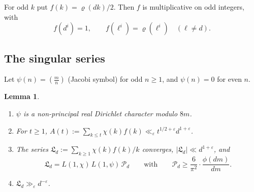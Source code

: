 \documentclass[11pt]{amsart}
\newtheorem{lemma}[theorem]{Lemma}
\theoremstyle{remark}
\theoremstyle{definition}
\numberwithin{equation}{section}
\newcommand{\eps}{\varepsilon}
\newcommand{\Lf}{\mathfrak{L}}
\newcommand{\leg}[2]{\left(\frac{#1}{#2}\right)}
\begin{document}
For odd $k$ put $f(k)=\varrho(dk)/2$. Then $f$ is multiplicative on odd integers, with
\begin{equation}\label{eq:f}
f(d^i)=1,\qquad f(\ell^i)=\varrho(\ell^i)\quad(\ell\ne d).
\end{equation}

\subsection{The singular series}
Let $\psi(n)=\leg mn$ (Jacobi symbol) for odd $n\ge1$, and $\psi(n)=0$ for even $n$.

\begin{lemma}\label{lem:L}
\begin{enumerate}
\item[(a)] $\psi$ is a non-principal real Dirichlet character modulo $8m$.
\item[(b)] For $t\ge1$, $A(t):=\sum_{k\le t}\chi(k)f(k)\ll_\eps t^{1/2+\eps}d^{1+\eps}$.
\item[(c)] The series $\Lf_d:=\sum_{k\ge1}\chi(k)f(k)/k$ converges, $|\Lf_d|\ll d^{1+\eps}$, and
\[
\Lf_d=L(1,\chi)\,L(1,\psi)\,\mathcal P_d\qquad\text{with}\qquad \mathcal P_d\ge\frac{6}{\pi^2}\cdot\frac{\phi(dm)}{dm}.
\]
\item[(d)] $\Lf_d\gg_\eps d^{-\eps}$.
\end{enumerate}
\end{lemma}
\end{document}
